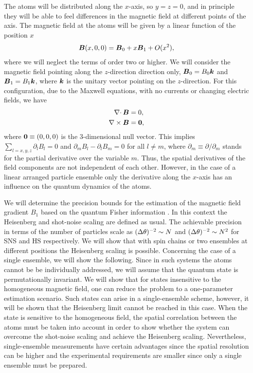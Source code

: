 The atoms will be distributed along the $x$-axis, so $y=z=0$, and in principle they will be able to feel differences in the magnetic field at different points of the axis.
The magnetic field at the atoms will be given by a linear function of the position $x$
\begin{equation}
\boldsymbol{B}(x,0,0)=\boldsymbol{B}_0 +x \boldsymbol{B}_1 + O(x^2),
\end{equation}
where we will neglect the terms of order two or higher.
We will consider the magnetic field pointing along the $z$-direction direction only, $\boldsymbol{B}_0=B_0 \boldsymbol{k}$ and $\boldsymbol{B}_1=B_1\boldsymbol{k}$, where $\boldsymbol{k}$ is the unitary vector pointing on the $z$-direction.
For this configuration, due to the Maxwell equations, with no currents or changing electric fields, we have
\begin{align}
\nabla \cdotp \boldsymbol{B}&=0, \nonumber \\
\nabla \times \boldsymbol{B}&=\boldsymbol{0},
\end{align}
where $\boldsymbol{0}\equiv (0,0,0)$ is the 3-dimensional null vector.
This implies $\sum_{l=x,y,z} \partial_l B_l=0$ and $ \partial_m B_l - \partial_l B_m =0$ for all $l\ne m$, where $\partial_m\equiv \partial/\partial_m$ stands for the partial derivative over the variable $m$.
Thus, the spatial derivatives of the field components are not independent of each other.
However, in the case of a linear arranged particle ensemble only the derivative along the $x$-axis has an influence on the quantum dynamics of the atoms.

We will determine the precision bounds for the estimation of the magnetic field gradient $B_1$ based on the quantum Fisher information \cite{Paris2009,Braunstein1994,Holevo1982,Helstrom1976,Petz2002,Petz2008}.
In this context the Heisenberg and shot-noise scaling are defined as usual.
The achievable precision in terms of the number of particles scale as $(\Delta \theta )^{-2}\sim N$ and $(\Delta \theta )^{-2}\sim N^2$ for SNS and HS respectively.
We will show that with spin chains or two ensembles at different positions the Heisenberg scaling is possible.
Concerning the case of a single ensemble, we will show the following.
Since in such systems the atoms cannot be be individually addressed, we will assume that the quantum state is permutationally invariant.
We will show that for states insensitive to the homogeneous magnetic field, one can reduce the problem to a one-parameter estimation scenario.
Such states can arise in a single-ensemble scheme, however, it will be shown that the Heisenberg limit cannot be reached in this case.
When the state is sensitive to the homogeneous field, the spatial correlation between the atoms must be taken into account in order to show whether the system can overcome the shot-noise scaling and achieve the Heisenberg scaling.
Nevertheless, single-ensemble measurements have certain advantages since the spatial resolution can be higher and the experimental requirements are smaller since only a single ensemble must be prepared.

